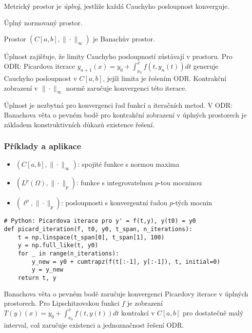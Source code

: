 \begin{definition}
Metrický prostor je \emph{úplný}, jestliže každá Cauchyho posloupnost konverguje.
\end{definition}

\begin{definition}
Úplný normovaný prostor.
\end{definition}

\begin{theorem}[O úplnosti]
Prostor $(C[a,b], \|\cdot\|_\infty)$ je Banachův prostor.
\end{theorem}

\begin{intuition}
Úplnost zajišťuje, že limity Cauchyho posloupností zůstávají v prostoru. Pro ODR: Picardova iterace $y_{n+1}(x) = y_0 + \int_{x_0}^x f(t,y_n(t))dt$ generuje Cauchyho posloupnost v $C[a,b]$, jejíž limita je řešením ODR. Kontrakční zobrazení v $\|\cdot\|_\infty$ normě zaručuje konvergenci této iterace.
\end{intuition}

\begin{keyinsight}
Úplnost je nezbytná pro konvergenci řad funkcí a iteračních metod. V ODR: Banachova věta o pevném bodě pro kontrakční zobrazení v úplných prostorech je základem konstruktivních důkazů existence řešení.
\end{keyinsight}

\subsubsection{Příklady a aplikace}

\begin{example}
\mbox{}
\begin{itemize}
\item $(C[a,b], \|\cdot\|_\infty)$: spojité funkce s normou maxima
\item $(L^p(\Omega), \|\cdot\|_p)$: funkce s integrovatelnou $p$-tou mocninou
\item $(\ell^p, \|\cdot\|_p)$: posloupnosti s konvergentní řadou $p$-tých mocnin
\end{itemize}
\end{example}
    
    

\begin{application}
\begin{verbatim}
# Python: Picardova iterace pro y' = f(t,y), y(t0) = y0
def picard_iteration(f, t0, y0, t_span, n_iterations):
    t = np.linspace(t_span[0], t_span[1], 100)
    y = np.full_like(t, y0)
    for _ in range(n_iterations):
        y_new = y0 + cumtrapz(f(t[:-1], y[:-1]), t, initial=0)
        y = y_new
    return t, y
\end{verbatim}
Banachova věta o pevném bodě zaručuje konvergenci Picardovy iterace v úplných prostorech. Pro Lipschitzovskou funkci $f$ je zobrazení $T(y)(x) = y_0 + \int_{x_0}^x f(t,y(t))dt$ kontrakcí v $C[a,b]$ pro dostatečně malý interval, což zaručuje existenci a jednoznačnost řešení ODR.
\end{application}

